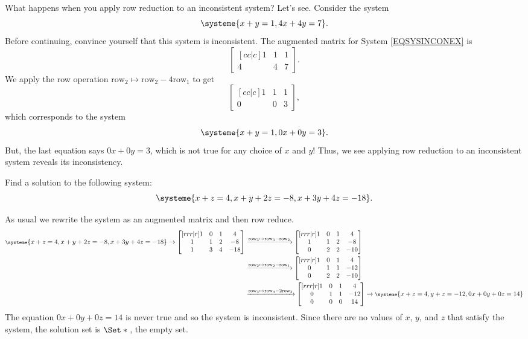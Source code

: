 	What happens when you apply row reduction to an inconsistent system? Let's see. Consider the system
	\begin{equation}
		\label{EQSYSINCONEX}
		\systeme{x+y=1,4x+4y=7}.
	\end{equation}
	Before continuing, convince yourself that this system is inconsistent.
	The augmented matrix for System \eqref{EQSYSINCONEX} is
	\[
		\begin{bmatrix}[cc|c]1&1&1\\4&4&7\end{bmatrix}.
	\]
	We apply the row operation $\text{row}_2\mapsto \text{row}_2-4\text{row}_1$ to get
	\[
		\begin{bmatrix}[cc|c]1&1&1\\0&0&3\end{bmatrix},
	\]
	which corresponds to the system
	\[
		\systeme{x+y=1,0x+0y=3}.
	\]
	But, the last equation says $0x+0y=3$, which is not true for any choice of $x$ and $y$!
	Thus, we see applying row reduction to an inconsistent system reveals its inconsistency.

	\begin{example}
		Find a solution to the following system:
		\[
			\systeme{
				x+z=4,
				x+y+2z=-8,
				x+3y+4z=-18
			}.
		\]

		As usual we rewrite the system as an augmented matrix and then row reduce.
		\begin{align*}
			{\footnotesize
			\systeme{
				x+z=4,
				x+y+2z=-8,
				x+3y+4z=-18
			}
			} \rightarrow
			\begin{bmatrix}[rrr|r]
				1&0&1 & 4\\
				1&1&2 & -8\\
				1&3&4 & -18
			\end{bmatrix}
			&\xrightarrow{\text{row}_3\mapsto\text{row}_3-\text{row}_2}
			\begin{bmatrix}[rrr|r]
				1&0&1 & 4\\
				1&1&2 & -8\\
				0&2&2 & -10
			\end{bmatrix}\\
			&\xrightarrow{\text{row}_2\mapsto\text{row}_2-\text{row}_1}
			\begin{bmatrix}[rrr|r]
				1&0&1 & 4\\
				0&1&1 & -12\\
				0&2&2 & -10
			\end{bmatrix}\\
			&\xrightarrow{\text{row}_3\mapsto\text{row}_3-2\text{row}_2}
			\begin{bmatrix}[rrr|r]
				1&0&1 & 4\\
				0&1&1 & -12\\
				0&0&0 & 14
			\end{bmatrix}
			\rightarrow
			{\footnotesize
				\systeme{
				x+z=4,
				y+z=-12,
				0x+0y+0z=14
				}
			}
		\end{align*}
		The equation $0x + 0y + 0z = 14$ is never true and so the system is inconsistent.
		Since there are no values of $x$, $y$, and $z$ that satisfy the system, the solution set is $\Set*{}$, the empty set.
	\end{example}
